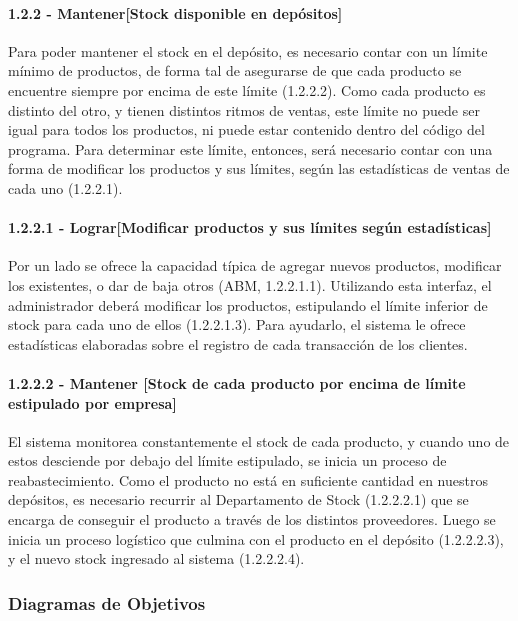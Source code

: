 \paragraph{1.2.2 - Mantener[Stock disponible en depósitos]} \label{para:1.2.2}

Para poder mantener el stock en el depósito, es necesario contar con un límite
mínimo de productos, de forma tal de asegurarse de que cada producto se
encuentre siempre por encima de este límite (1.2.2.2). Como cada producto es
distinto del otro, y tienen distintos ritmos de ventas, este límite no puede ser
igual para todos los productos, ni puede estar contenido dentro del código del
programa. Para determinar este límite, entonces, será necesario contar con una
forma de modificar los productos y sus límites, según las estadísticas de ventas
de cada uno (1.2.2.1).

\paragraph{1.2.2.1 - Lograr[Modificar productos y sus límites según estadísticas]} \label{para:1.2.2.1}

Por un lado se ofrece la capacidad típica de agregar nuevos productos, modificar
los existentes, o dar de baja otros (ABM, 1.2.2.1.1). Utilizando esta interfaz,
el administrador deberá modificar los productos, estipulando el límite inferior
de stock para cada uno de ellos (1.2.2.1.3). Para ayudarlo, el sistema le ofrece
estadísticas elaboradas sobre el registro de cada transacción de los clientes.

\paragraph{1.2.2.2 - Mantener [Stock de cada producto por encima de límite estipulado por empresa]} \label{para:1.2.2.2}

El sistema monitorea constantemente el stock de cada producto, y cuando uno de
estos desciende por debajo del límite estipulado, se inicia un proceso de
reabastecimiento. Como el producto no está en suficiente cantidad en nuestros
depósitos, es necesario recurrir al Departamento de Stock (1.2.2.2.1) que se
encarga de conseguir el producto a través de los distintos proveedores. Luego se
inicia un proceso logístico que culmina con el producto en el depósito
(1.2.2.2.3), y el nuevo stock ingresado al sistema (1.2.2.2.4).

\subsubsection{Diagramas de Objetivos}

